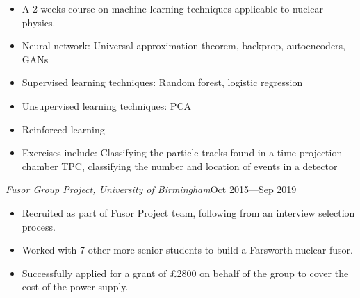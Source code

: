 \documentclass[a4paper, 12pt]{article}
\newcommand{\expentry}[3]{\emph{#1}\hfill{#2}---{#3}}
\begin{document}
    \begin{itemize}
    \item A 2 weeks course on machine learning techniques applicable to nuclear physics.
    \item Neural network: Universal approximation theorem, backprop, autoencoders, GANs
    \item Supervised learning techniques: Random forest, logistic regression
    \item Unsupervised learning techniques: PCA
    \item Reinforced learning
    \item Exercises include: Classifying the particle tracks found in a time projection chamber TPC, classifying the number and location of events in a detector
    \end{itemize}
\expentry{Fusor Group Project, University of Birmingham}{Oct 2015}{Sep 2019}
    \begin{itemize}
    \setlength\itemsep{0em}
    \item Recruited as part of Fusor Project team, following from an interview selection process.
    \item Worked with 7 other more senior students to build a Farsworth nuclear fusor.
    \item Successfully applied for a grant of \pounds 2800 on behalf of the group to cover the cost of the power supply. 
    \end{itemize}
\end{document}
